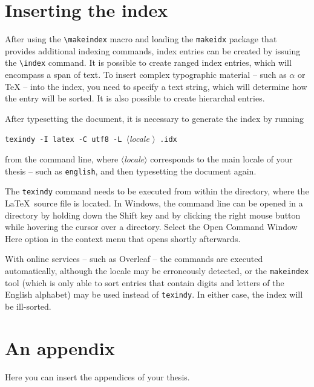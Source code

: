 \documentclass[
  digital, %
  oneside, %
  table,   %
  lof,     %
  lot,     %
]{fithesis3}
\begin{document}
  \printbibliography[heading=bibintoc] %

\chapter{Inserting the index}
After using the \verb"\makeindex" macro and loading the
\texttt{makeidx} package that provides additional indexing
commands, index entries can be created by issuing the \verb"\index"
command. It is possible to create ranged index
entries, which will encompass a span of text.
To insert complex typographic material -- such as $\alpha$
 or \TeX{}  --
into the index, you need to specify a text string, which will
determine how the entry will be sorted. It is also possible to
create hierarchal entries. 

After typesetting the document, it is necessary to generate the
index by running
\begin{center}%
  \texttt{texindy -I latex -C utf8 -L }$\langle$\textit{locale}%
  $\rangle$\texttt{ \jobname.idx}
\end{center}
from the command line, where $\langle$\textit{locale}$\rangle$
corresponds to the main locale of your thesis -- such as
\texttt{english}, and then typesetting the document again.

The \texttt{texindy} command needs to be executed from within the
directory, where the \LaTeX\ source file is located. In Windows,
the command line can be opened in a directory by holding down the
\textsf{Shift} key and by clicking the right mouse button while
hovering the cursor over a directory. Select the \textsf{Open Command
Window Here} option in the context menu that opens shortly
afterwards.

With online services -- such as Overleaf -- the commands are
executed automatically, although the locale may be erroneously
detected, or the \texttt{makeindex} tool (which is only able to
sort entries that contain digits and letters of the English
alphabet) may be used instead of \texttt{texindy}. In either case,
the index will be ill-sorted.

  \makeatletter\thesis@blocks@clear\makeatother
  \printindex

\appendix %

\chapter{An appendix}
Here you can insert the appendices of your thesis.
\end{document}
